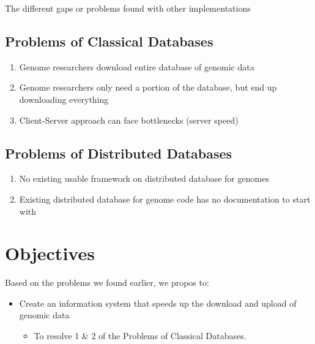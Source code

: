 \documentclass{article}
\begin{document}
The different gaps or problems found with other implementations
\subsection{Problems of Classical Databases}
\begin{enumerate}
\item Genome researchers download entire database of genomic data
\item Genome researchers only need a portion of the database, but end up downloading everything
\item Client-Server approach can face bottlenecks (server speed)
\end{enumerate}

\subsection{Problems of Distributed Databases}
\begin{enumerate}
    \item No existing usable framework on distributed database for genomes
    \item Existing distributed database for genome code has no documentation to start with %
\end{enumerate}


\section{Objectives}



Based on the problems we found earlier, we propos to:

\begin{itemize}
    \item Create an information system that speeds up the download and upload of genomic data
    \begin{itemize}
        \item To resolve 1 \& 2 of the Problems of Classical Databases. 
    \end{itemize}
\end{itemize}
\end{document}

